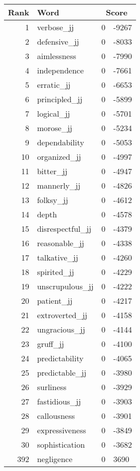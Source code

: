 \begin{longtable}[!htbp]{| rlr@{.}l |}
    \hline
    \textbf{Rank} & \textbf{Word} & \multicolumn{2}{c|}{\textbf{Score}} \\
    \hline
    \endhead
    1 & verbose\_jj & 0 & -9267 \\
    2 & defensive\_jj & 0 & -8033 \\
    3 & aimlessness & 0 & -7990 \\
    4 & independence & 0 & -7661 \\
    5 & erratic\_jj & 0 & -6653 \\
    6 & principled\_jj & 0 & -5899 \\
    7 & logical\_jj & 0 & -5701 \\
    8 & morose\_jj & 0 & -5234 \\
    9 & dependability & 0 & -5053 \\
    10 & organized\_jj & 0 & -4997 \\
    11 & bitter\_jj & 0 & -4947 \\
    12 & mannerly\_jj & 0 & -4826 \\
    13 & folksy\_jj & 0 & -4612 \\
    14 & depth & 0 & -4578 \\
    15 & disrespectful\_jj & 0 & -4379 \\
    16 & reasonable\_jj & 0 & -4338 \\
    17 & talkative\_jj & 0 & -4260 \\
    18 & spirited\_jj & 0 & -4229 \\
    19 & unscrupulous\_jj & 0 & -4222 \\
    20 & patient\_jj & 0 & -4217 \\
    21 & extroverted\_jj & 0 & -4158 \\
    22 & ungracious\_jj & 0 & -4144 \\
    23 & gruff\_jj & 0 & -4100 \\
    24 & predictability & 0 & -4065 \\
    25 & predictable\_jj & 0 & -3980 \\
    26 & surliness & 0 & -3929 \\
    27 & fastidious\_jj & 0 & -3903 \\
    28 & callousness & 0 & -3901 \\
    29 & expressiveness & 0 & -3849 \\
    30 & sophistication & 0 & -3682 \\
    392 & negligence & 0 & 3690 \\

\end{longtable}
